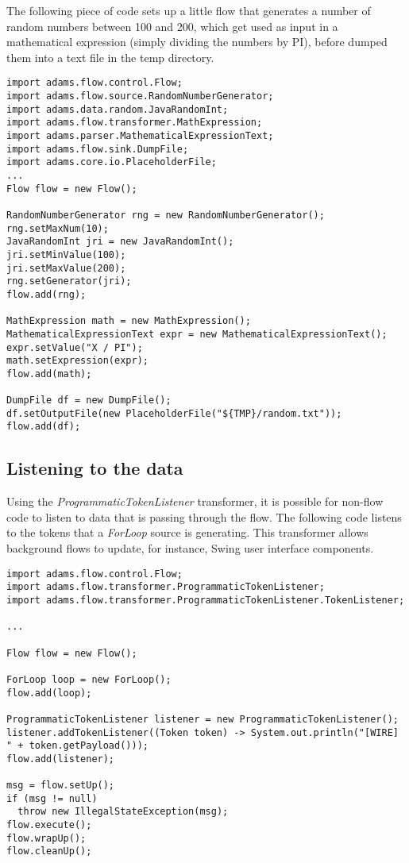 The following piece of code sets up a little flow that generates a number
of random numbers between 100 and 200, which get used as input in a mathematical 
expression (simply dividing the numbers by PI), before dumped them into a 
text file in the temp directory.
\begin{verbatim}
import adams.flow.control.Flow;
import adams.flow.source.RandomNumberGenerator;
import adams.data.random.JavaRandomInt;
import adams.flow.transformer.MathExpression;
import adams.parser.MathematicalExpressionText;
import adams.flow.sink.DumpFile;
import adams.core.io.PlaceholderFile;
...
Flow flow = new Flow();

RandomNumberGenerator rng = new RandomNumberGenerator();
rng.setMaxNum(10);
JavaRandomInt jri = new JavaRandomInt();
jri.setMinValue(100);
jri.setMaxValue(200);
rng.setGenerator(jri);
flow.add(rng);

MathExpression math = new MathExpression();
MathematicalExpressionText expr = new MathematicalExpressionText();
expr.setValue("X / PI");
math.setExpression(expr);
flow.add(math);

DumpFile df = new DumpFile();
df.setOutputFile(new PlaceholderFile("${TMP}/random.txt"));
flow.add(df);
\end{verbatim}

\subsection{Listening to the data}
Using the \textit{ProgrammaticTokenListener} transformer, it is possible for
non-flow code to listen to data that is passing through the flow.
The following code listens to the tokens that a \textit{ForLoop} source
is generating. This transformer allows background flows to update, for instance,
Swing user interface components.

\begin{verbatim}
import adams.flow.control.Flow;
import adams.flow.transformer.ProgrammaticTokenListener;
import adams.flow.transformer.ProgrammaticTokenListener.TokenListener;

...

Flow flow = new Flow();

ForLoop loop = new ForLoop();
flow.add(loop);

ProgrammaticTokenListener listener = new ProgrammaticTokenListener();
listener.addTokenListener((Token token) -> System.out.println("[WIRE] " + token.getPayload()));
flow.add(listener);

msg = flow.setUp();
if (msg != null)
  throw new IllegalStateException(msg);
flow.execute();
flow.wrapUp();
flow.cleanUp();
\end{verbatim}

